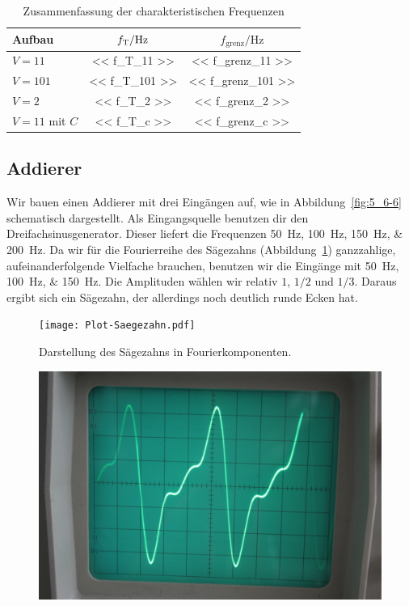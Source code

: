 \begin{table}[htbp]
	\centering
	\begin{tabular}{lSS}
		{Aufbau} &
		{$\fT / \si\hertz$} &
		{$f_\text{grenz} / \si\hertz$} \\
		\hline
		$V = 11$ & << f_T_11 >> & << f_grenz_11 >> \\
		$V = 101$ & << f_T_101 >> & << f_grenz_101 >> \\
		$V = 2$ & << f_T_2 >> & << f_grenz_2 >> \\
		$V = 11$ mit $C$ & << f_T_c >> & << f_grenz_c >> \\
	\end{tabular}
	\caption{%
		Zusammenfassung der charakteristischen Frequenzen
	}
	\label{tab:Verstaerker-Zusammenfassung}
\end{table}

\FloatBarrier
\subsection{Addierer}

Wir bauen einen Addierer mit drei Eingängen auf, wie in
Abbildung~\ref{fig:5_6-6} schematisch dargestellt. Als Eingangsquelle benutzen
dir den Dreifachsinusgenerator. Dieser liefert die Frequenzen
\SIlist{50;100;150;200}{\hertz}. Da wir für die Fourierreihe des Sägezahns
(Abbildung~\ref{fig:saegezahn}) ganzzahlige, aufeinanderfolgende Vielfache
brauchen, benutzen wir die Eingänge mit \SIlist{50;100;150}{\hertz}. Die
Amplituden wählen wir relativ $1$, $1/2$ und $1/3$. Daraus ergibt sich ein
Sägezahn, der allerdings noch deutlich runde Ecken hat.

\begin{figure}[htbp]
	\centering
	\texttt{[image: Plot-Saegezahn.pdf]}
	\caption{%
		Darstellung des Sägezahns in Fourierkomponenten.
	}
	\label{fig:saegezahn}
\end{figure}

\begin{figure}[htbp]
	\centering
	\includegraphics[width=.45\linewidth]{Oszi_Foto/5-811.jpg}
	\caption{%
	}
	\label{fig:811}
\end{figure}

